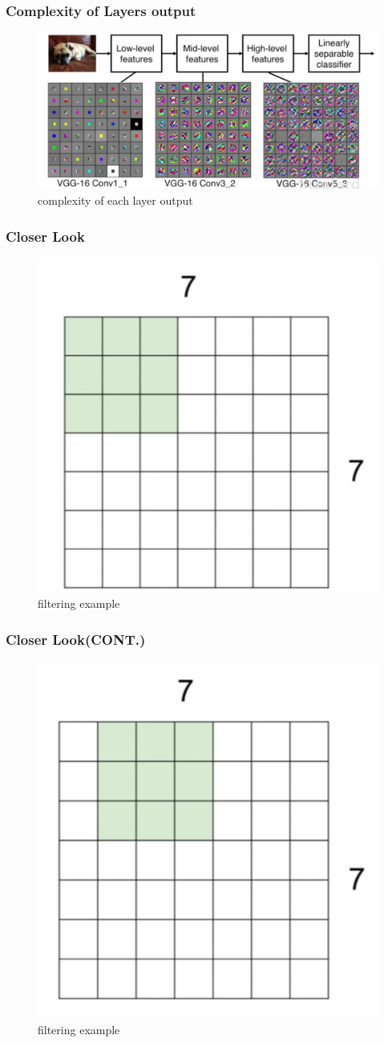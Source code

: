 \documentclass{beamer}
\begin{document}
\begin{frame}
\frametitle{Complexity of Layers output}

\begin{figure}
	\includegraphics[width=\linewidth]{Pics/hlayer.png}
	\caption{complexity of each layer output}
\end{figure}

\end{frame}
\begin{frame}
\frametitle{Closer Look }

\begin{figure}
	\includegraphics[width=.5\linewidth]{Pics/clook.png}
	\caption{filtering example}
\end{figure}

\end{frame}
\begin{frame}
\frametitle{Closer Look(CONT.)}

\begin{figure}
	\includegraphics[width=.5\linewidth]{Pics/clook2.png}
	\caption{filtering example}
\end{figure}

\end{frame}
\end{document}
